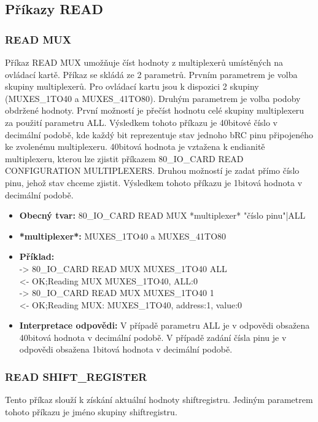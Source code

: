 \subsection{Příkazy READ}
\subsubsection{READ MUX}
Příkaz READ MUX umožňuje číst hodnoty z multiplexerů umístěných na ovládací kartě. Příkaz se skládá ze 2 parametrů. Prvním parametrem je volba
skupiny multiplexerů. Pro ovládací kartu jsou k dispozici 2 skupiny (MUXES\_1TO40 a MUXES\_41TO80). Druhým parametrem je volba podoby obdržené hodnoty.
První možností je přečíst hodnotu celé skupiny multiplexeru za použití parametru ALL. Výsledkem tohoto příkazu je 40bitové číslo v decimální podobě,
kde každý bit reprezentuje stav jednoho bRC pinu připojeného ke zvolenému multiplexeru. 40bitová hodnota je vztažena k endianitě multiplexeru, kterou lze zjistit
příkazem 80\_IO\_CARD READ CONFIGURATION MULTIPLEXERS.
Druhou možností je zadat přímo číslo pinu, jehož stav chceme zjistit. Výsledkem tohoto příkazu je 1bitová hodnota v decimální podobě.
\begin{itemize}[leftmargin=*]
    \item \textbf{Obecný tvar:} 80\_IO\_CARD READ MUX *multiplexer* "číslo pinu"|ALL
    \item \textbf{*multiplexer*:} MUXES\_1TO40 a MUXES\_41TO80
    \item \textbf{Příklad:}\\
    -> 80\_IO\_CARD READ MUX MUXES\_1TO40 ALL\\
    <- OK;Reading MUX MUXES\_1TO40, ALL:0\\
    -> 80\_IO\_CARD READ MUX MUXES\_1TO40 1\\
    <- OK;Reading MUX: MUXES\_1TO40, address:1, value:0
    \item \textbf{Interpretace odpovědi:} V případě parametru ALL je v odpovědi obsažena 40bitová hodnota v decimální podobě. V případě zadání čísla pinu je v odpovědi obsažena 1bitová hodnota v decimální podobě.
\end{itemize}

\subsubsection{READ SHIFT\_REGISTER}
Tento příkaz slouží k získání aktuální hodnoty shiftregistru. Jediným parametrem tohoto příkazu je jméno skupiny shiftregistru.


